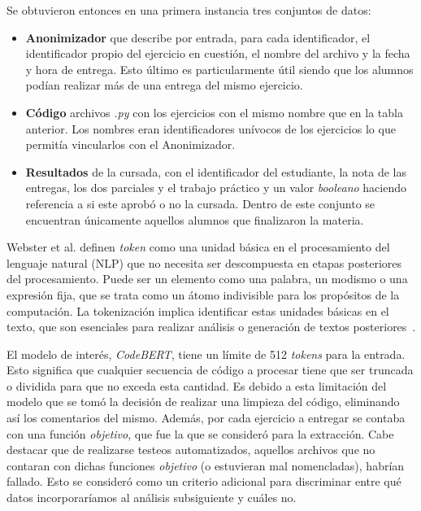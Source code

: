\documentclass[11pt,a4paper,twoside,openany]{tesis}
\begin{document}
Se obtuvieron entonces en una primera instancia tres conjuntos de datos: 
\begin{itemize}
    \item \textbf{Anonimizador} que describe por entrada, para cada identificador, el identificador propio del ejercicio en cuestión, el nombre del archivo y la fecha y hora de entrega. Esto último es particularmente útil siendo que los alumnos podían realizar más de una entrega del mismo ejercicio.
    \item \textbf{Código} archivos \emph{.py} con los ejercicios con el mismo nombre que en la tabla anterior. Los nombres eran identificadores unívocos de los ejercicios lo que permitía vincularlos con el Anonimizador.
    \item \textbf{Resultados} de la cursada, con el identificador del estudiante, la nota de las entregas, los dos parciales y el trabajo práctico y un valor \emph{booleano} haciendo referencia a si este aprobó o no la cursada. Dentro de este conjunto se encuentran únicamente aquellos alumnos que finalizaron la materia.  
\end{itemize} 

Webster et al. definen \emph{token} como una unidad básica en el procesamiento del lenguaje natural (NLP) que no necesita ser descompuesta en etapas posteriores del procesamiento. Puede ser un elemento como una palabra, un modismo o una expresión fija, que se trata como un átomo indivisible para los propósitos de la computación. La tokenización implica identificar estas unidades básicas en el texto, que son esenciales para realizar análisis o generación de textos posteriores~\cite{tokens}.

El modelo de interés, \emph{CodeBERT}, tiene un límite de 512 \emph{tokens} para la entrada. Esto significa que cualquier secuencia de código a procesar tiene que ser truncada o dividida para que no exceda esta cantidad. Es debido a esta limitación del modelo que se tomó la decisión de realizar una limpieza del código, eliminando así los comentarios del mismo. Además, por cada ejercicio a entregar se contaba con una función \emph{objetivo}, que fue la que se consideró para la extracción. Cabe destacar que de realizarse testeos automatizados, aquellos archivos que no contaran con dichas funciones \emph{objetivo} (o estuvieran mal nomencladas), habrían fallado. Esto se consideró como un criterio adicional para discriminar entre qué datos incorporaríamos al análisis subsiguiente y cuáles no. 
\end{document}
